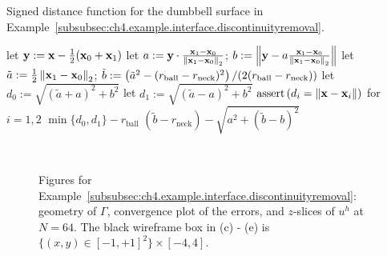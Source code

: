 \begin{algorithm}[htbp]
\caption{Signed distance function for the dumbbell surface in Example~\ref{subsubsec:ch4.example.interface.discontinuityremoval}.}
\label{alg:ch4.examples.interface.dumbbell}
\begin{algorithmic}[1]
\STATE {}
\STATE {}
\STATE let $\mathbf{y} := \mathbf{x} - \frac{1}{2} (\mathbf{x}_0 + \mathbf{x}_1)$
\STATE {}
\STATE let $a := \mathbf{y} \cdot \frac{\mathbf{x}_1 - \mathbf{x}_0}{\left\lVert \mathbf{x}_1 - \mathbf{x}_0 \right\rVert_2}$; $b := \left\lVert \mathbf{y} - a \frac{\mathbf{x}_1 - \mathbf{x}_0}{\left\lVert \mathbf{x}_1 - \mathbf{x}_0 \right\rVert_2} \right\rVert$
\STATE let $\tilde{a} := \frac{1}{2} \left\lVert \mathbf{x}_1 - \mathbf{x}_0 \right\rVert_2$; $\tilde{b} := \left( \tilde{a}^2 - (r_{\text{ball}} - r_{\text{neck}})^2 \right) / (2 (r_{\text{ball}} - r_{\text{neck}}))$
    \STATE let $d_0 := \sqrt{(\tilde{a} + a)^2 + b^2}$ 
    \STATE let $d_1 := \sqrt{(\tilde{a} - a)^2 + b^2}$ 
    \STATE $\operatorname{assert} \left( d_i = \left\lVert \mathbf{x} - \mathbf{x}_i \right\rVert \right)$ for $i = 1,2$
    \RETURN $\min \{d_0, d_1\} - r_{\text{ball}}$
\ELSE
    \RETURN $(\tilde{b} - r_{\text{neck}}) - \sqrt{a^2 + (\tilde{b} - b)^2}$
\ENDIF
\end{algorithmic}
\end{algorithm}

\setlength{\figureheighti}{0.43\textwidth}
\setlength{\figurewidthii}{0.33\textwidth}
\begin{figure}[htbp]
\centering
{}
 \\
\caption{Figures for Example~\ref{subsubsec:ch4.example.interface.discontinuityremoval}: geometry of $\Gamma$, convergence plot of the errors, and $z$-slices of $u^h$ at $N = 64$. The black wireframe box in (c) - (e) is $\{(x,y) \in [-1,+1]^2\} \times [-4,4]$.}
\label{fig:ch4.example.interface.discontinuityremoval}
\end{figure}

